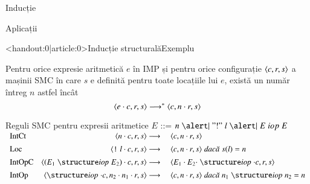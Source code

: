 \documentclass[xcolor=pdftex,romanian,colorlinks]{beamer}
\begin{document}
\begin{section}{Inducție}
\begin{subsection}{Aplicații}
\begin{frame}<handout:0|article:0>{Inducție structurală}{Exemplu}
\begin{theorem}
Pentru orice expresie aritmetică $e$ în IMP și pentru  orice configurație ${\langle{c,r,s}\rangle}$ a mașinii SMC în care $s$ e definită pentru toate locațiile lui $e$, există un număr întreg $n$ astfel încât 
$${\langle{e\cdot c,  r, s}\rangle} \longrightarrow^\ast {\ensuremath \langle{c, n\cdot r, s}\rangle}$$
\end{theorem}
\begin{block}{Reguli SMC pentru expresii  aritmetice $E$ ::= $n \Smid {\mathrel{"!"} l} \Smid E \mathrel{iop} E$}
$\begin{array}{l@{\extracolsep{1em}}r@{{}\longrightarrow{}}l}
\mbox{IntCt}&
\c{n\cdot c,r,s} & \c{c, n \cdot r, s}
\\[1ex]
\mbox{Loc}&
\c{\terminal{!} l\cdot c,r,s} & \c{c, n \cdot r, s}  \Sdaca s(l) = n
\\[1ex]
\mbox{IntOpC}&
\c{(E_1 \iop E_2) \cdot c, r, s} & \c{E_1 \cdot E_2 \cdot \iop \cdot c, r, s}
\\[1ex]
\mbox{IntOp}&
\c{\iop \cdot c, n_2\cdot n_1 \cdot r, s} & \c{c, n \cdot r, s} \Sdaca n_1 \iop n_2 = n
\end{array}$
\end{block}
\end{frame}



\begin{frame}{}{}


\end{frame}
\end{subsection}
\end{section}
\end{document}
